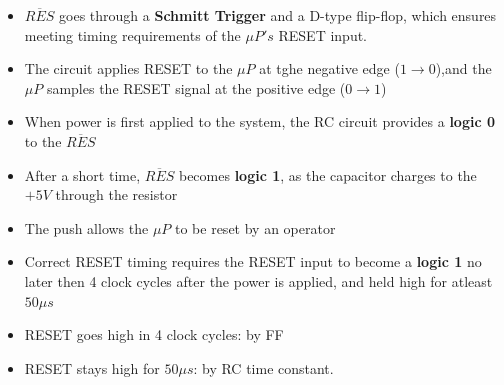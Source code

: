 \begin{itemize}
  \item $\overline{RES}$ goes through a \textbf{Schmitt Trigger} and a D-type flip-flop, which ensures meeting timing requirements of the $\mu P's$ RESET input.
  \item The circuit applies RESET to the $\mu P$ at tghe negative edge ($1 \longrightarrow 0$),and the $\mu P$ samples the RESET signal at the positive edge ($0 \longrightarrow 1$)
  \item When power is first applied to the system, the RC circuit provides a \textbf{logic 0} to the $\overline{RES}$
  \item After a short time, $\overline{RES}$ becomes \textbf{logic 1}, as the capacitor charges to the $+5V$ through the resistor
  \item The push allows the $\mu P$ to be reset by an operator
  \item Correct RESET timing requires the RESET input to become a \textbf{logic 1} no later then 4 clock cycles after the power is applied, and held high for atleast $50 \mu s$
  \item RESET goes high in 4 clock cycles: by FF
  \item RESET stays high for $50 \mu s$: by RC time constant.
\end{itemize}
